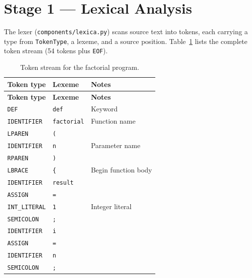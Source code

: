 \documentclass[11pt,a4paper]{article}
\begin{document}
\section{Stage 1 --- Lexical Analysis}

The lexer (\texttt{components/lexica.py}) scans source text into tokens, each
carrying a type from \texttt{TokenType}, a lexeme, and a source position.
Table~\ref{tab:tokens} lists the complete token stream (54 tokens plus \texttt{EOF}).

\begin{longtable}{@{}lll@{}}
  \caption{Token stream for the factorial program.}\label{tab:tokens}\\
  \toprule
  \textbf{Token type} & \textbf{Lexeme} & \textbf{Notes} \\
  \midrule
  \endfirsthead
  \toprule
  \textbf{Token type} & \textbf{Lexeme} & \textbf{Notes} \\
  \midrule
  \endhead
  \bottomrule
  \endfoot
  \rowcolor{rowgray}
  \texttt{DEF}        & \texttt{def}       & Keyword \\
  \texttt{IDENTIFIER} & \texttt{factorial} & Function name \\
  \rowcolor{rowgray}
  \texttt{LPAREN}     & \texttt{(}         & \\
  \texttt{IDENTIFIER} & \texttt{n}         & Parameter name \\
  \rowcolor{rowgray}
  \texttt{RPAREN}     & \texttt{)}         & \\
  \texttt{LBRACE}     & \texttt{\{}        & Begin function body \\
  \rowcolor{rowgray}
  \texttt{IDENTIFIER} & \texttt{result}    & \\
  \texttt{ASSIGN}     & \texttt{=}         & \\
  \rowcolor{rowgray}
  \texttt{INT\_LITERAL} & \texttt{1}         & Integer literal \\
  \texttt{SEMICOLON}  & \texttt{;}         & \\
  \rowcolor{rowgray}
  \texttt{IDENTIFIER} & \texttt{i}         & \\
  \texttt{ASSIGN}     & \texttt{=}         & \\
  \rowcolor{rowgray}
  \texttt{IDENTIFIER} & \texttt{n}         & \\
  \texttt{SEMICOLON}  & \texttt{;}         & \\

\end{longtable}
\end{document}
